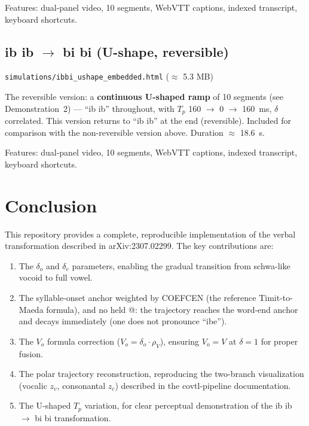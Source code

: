 \documentclass[11pt,a4paper]{article}
\begin{document}
Features: dual-panel video, 10 segments, WebVTT captions, indexed
transcript, keyboard shortcuts.

\subsection{ib ib $\to$ bi bi (U-shape, reversible)}

\texttt{simulations/ibbi\_ushape\_embedded.html} ($\approx$ 5.3 MB)

The reversible version: a \textbf{continuous U-shaped ramp} of 10
segments (see Demonstration~2) --- ``ib ib'' throughout, with $T_p$
160 $\to$ 0 $\to$ 160~ms, $\delta$ correlated. This version returns
to ``ib ib'' at the end (reversible). Included for comparison with
the non-reversible version above. Duration $\approx$ 18.6~s.

Features: dual-panel video, 10 segments, WebVTT captions, indexed
transcript, keyboard shortcuts.

\section{Conclusion}

This repository provides a complete, reproducible implementation of
the verbal transformation described in arXiv:2307.02299. The key
contributions are:

\begin{enumerate}
\item The $\delta_o$ and $\delta_e$ parameters, enabling the
  gradual transition from schwa-like vocoid to full vowel.

\item The syllable-onset anchor weighted by COEFCEN (the reference
  Timit-to-Maeda formula), and no held @: the trajectory reaches the
  word-end anchor and decays immediately (one does not pronounce
  ``ibe'').

\item The $V_o$ formula correction ($V_o = \delta_o \cdot \rho_V$),
  ensuring $V_o = V$ at $\delta = 1$ for proper fusion.

\item The polar trajectory reconstruction, reproducing the
  two-branch visualization (vocalic $z_v$, consonantal $z_c$)
  described in the covtl-pipeline documentation.

\item The U-shaped $T_p$ variation, for clear perceptual
  demonstration of the ib ib $\to$ bi bi transformation.
\end{enumerate}
\end{document}
